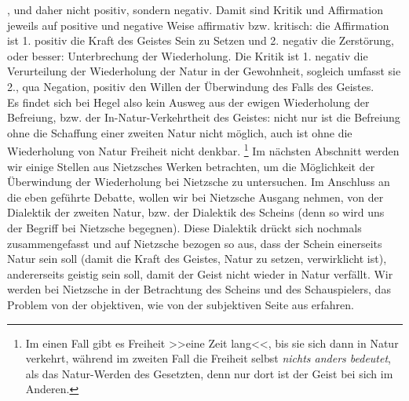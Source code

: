 \documentclass[12pt, a4paper, openany]{report}
\begin{document}
, und daher nicht positiv, sondern negativ.
Damit sind Kritik und Affirmation jeweils auf positive und negative Weise affirmativ bzw. kritisch:
die Affirmation ist 1. positiv die Kraft des Geistes Sein zu Setzen und 2. negativ die Zerstörung, oder besser: 
Unterbrechung der Wiederholung. 
Die Kritik ist 1. negativ die Verurteilung der Wiederholung der Natur in der Gewohnheit, sogleich umfasst sie 2., qua Negation, positiv den Willen der Überwindung des Falls des Geistes.\\

Es findet sich bei Hegel also kein Ausweg aus der ewigen Wiederholung der Befreiung, bzw. der In-Natur-Verkehrtheit des Geistes:
nicht nur ist die Befreiung ohne die Schaffung einer zweiten Natur nicht möglich, auch ist ohne die Wiederholung von Natur Freiheit nicht denkbar.%
\footnote{
    Im einen Fall gibt es Freiheit >>eine Zeit lang<<, bis sie sich dann in Natur verkehrt, während im zweiten Fall die Freiheit selbst \emph{nichts anders bedeutet}, als das Natur-Werden des Gesetzten, denn nur dort ist der Geist bei sich im Anderen.
}
Im nächsten Abschnitt werden wir einige Stellen aus Nietzsches Werken betrachten, um die Möglichkeit der Überwindung der Wiederholung bei Nietzsche zu untersuchen.
Im Anschluss an die eben geführte Debatte, wollen wir bei Nietzsche Ausgang nehmen, von der Dialektik der zweiten Natur, bzw. der Dialektik des Scheins (denn so wird uns der Begriff bei Nietzsche begegnen).
Diese Dialektik drückt sich nochmals zusammengefasst und auf Nietzsche bezogen so aus, dass der Schein einerseits Natur sein soll (damit die Kraft des Geistes, Natur zu setzen, verwirklicht ist), andererseits geistig sein soll, damit der Geist nicht wieder in Natur verfällt. 
Wir werden bei Nietzsche in der Betrachtung des Scheins und des Schauspielers, das Problem von der objektiven, wie von der subjektiven Seite aus erfahren. 
\end{document}

